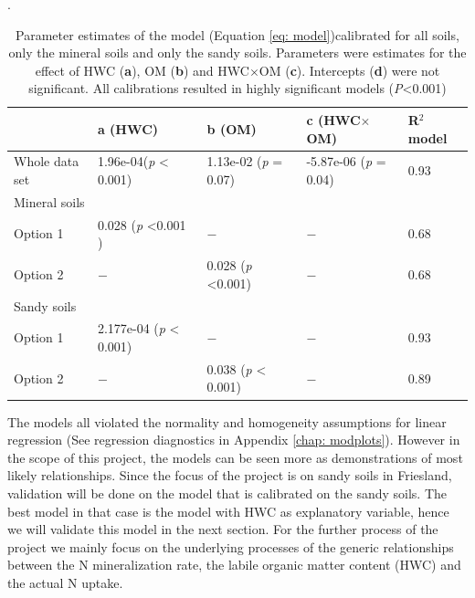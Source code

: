 \documentclass[10pt,twoside,dutch,english]{report}
\begin{document}
\begin{table}[h] %
	\caption{Parameter estimates of the model (Equation \ref{eq: model})calibrated for all soils, only the mineral soils and only the sandy soils. Parameters were estimates for the effect of HWC (\textbf{a}), OM (\textbf{b}) and HWC$\times$OM (\textbf{c}). Intercepts (\textbf{d}) were not significant. All calibrations resulted in highly significant models (\textit{P}<0.001)}.
	\footnotesize 
	\renewcommand{\arraystretch}{1.2}
	
	
	\begin{tabu} to %
		\toprule	\rowfont{\bfseries}
       										 & a \quad (HWC)	 &b \quad (OM)         &c (HWC$\times$OM)          						& R$^{2}$ model\\ \midrule
                                             
     Whole data set        & 1.96e-04(\textit{p} < 0.001)		 & 1.13e-02 (\textit{p} = 0.07)		& -5.87e-06 (\textit{p} = 0.04)		&0.93\\
     										
     Mineral soils             &&&\\
     \quad Option 1			& 0.028 (\textit{p} <0.001	)&$-$									&$-$									 					 				&0.68\\
     									
   \quad Option 2			& $-$	      						&	 0.028	(\textit{p} <0.001)		&$-$																	&0.68\\
     	
 
      Sandy soils             &&&\\
     \quad Option 1			& 2.177e-04 (\textit{p} < 0.001)	&$-$									&$-$									 								&0.93\\
     				
   \quad Option 2			& $-$							&	0.038 (\textit{p} < 0.001)			&$-$																		&0.89\\
     						

        \bottomrule
	\end{tabu}
		\label{tab:parameters}
\end{table}


The models all violated the normality and homogeneity assumptions for linear regression (See regression diagnostics in Appendix \ref{chap: modplots}). However in the scope of this project, the models can be seen more as  demonstrations of most likely relationships. Since the focus of the project is on sandy soils in Friesland, validation will be done on the model that is calibrated on the sandy soils. The best model in that case is the model with HWC as explanatory variable, hence we will validate this model in the next section. For the further process of the project we mainly focus on the underlying processes of the generic relationships between the N mineralization rate, the labile organic matter content (HWC) and the actual N uptake.  
\end{document}
